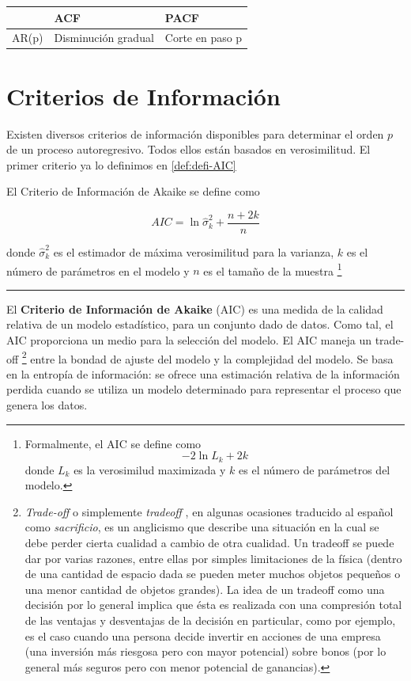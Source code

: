 \documentclass[12pt,]{krantz}
\theoremstyle{definition}
\theoremstyle{definition}
\theoremstyle{definition}
\theoremstyle{remark}
\let\BeginKnitrBlock\begin \let\EndKnitrBlock\end
\begin{document}
\begin{longtable}[]{@{}lll@{}}
\toprule
& ACF & PACF\tabularnewline
\midrule
\endhead
AR(p) & Disminución gradual & Corte en paso p\tabularnewline
\bottomrule
\end{longtable}

\section{Criterios de Información}\label{criterios-de-informacion}

Existen diversos criterios de información disponibles para determinar el
orden \(p\) de un proceso autoregresivo. Todos ellos están basados en
verosimilitud. El primer criterio ya lo definimos en \ref{def:defi-AIC}

\BeginKnitrBlock{definition}
\protect\hypertarget{def:defi-AIC-2}{}{\label{def:defi-AIC-2} }El Criterio
de Información de Akaike se define como

\begin{equation}
AIC = \ln\hat{\sigma}_k^2+\frac{n+2k}{n}
\label{eq:eq-AIC}
\end{equation}

donde \(\hat{\sigma}_k^2\) es el estimador de máxima verosimilitud para
la varianza, \(k\) es el número de parámetros en el modelo y \(n\) es el
tamaño de la muestra \footnote{Formalmente, el AIC se define como
  \[-2\ln L_k+2k\] donde \(L_k\) es la verosimilud maximizada y \(k\) es
  el número de parámetros del modelo.}
\EndKnitrBlock{definition}

\begin{center}\rule{0.5\linewidth}{\linethickness}\end{center}

El \textbf{Criterio de Información de Akaike} (AIC) es una medida de la
calidad relativa de un modelo estadístico, para un conjunto dado de
datos. Como tal, el AIC proporciona un medio para la selección del
modelo. El AIC maneja un trade-off \footnote{\emph{Trade-off} o
  simplemente \emph{tradeoff} , en algunas ocasiones traducido al
  español como \emph{sacrificio}, es un anglicismo que describe una
  situación en la cual se debe perder cierta cualidad a cambio de otra
  cualidad. Un tradeoff se puede dar por varias razones, entre ellas por
  simples limitaciones de la física (dentro de una cantidad de espacio
  dada se pueden meter muchos objetos pequeños o una menor cantidad de
  objetos grandes). La idea de un tradeoff como una decisión por lo
  general implica que ésta es realizada con una compresión total de las
  ventajas y desventajas de la decisión en particular, como por ejemplo,
  es el caso cuando una persona decide invertir en acciones de una
  empresa (una inversión más riesgosa pero con mayor potencial) sobre
  bonos (por lo general más seguros pero con menor potencial de
  ganancias).} entre la bondad de ajuste del modelo y la complejidad del
modelo. Se basa en la entropía de información: se ofrece una estimación
relativa de la información perdida cuando se utiliza un modelo
determinado para representar el proceso que genera los datos.
\end{document}
